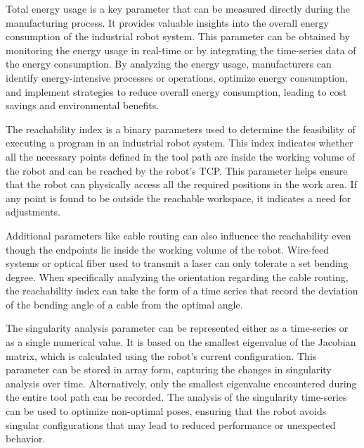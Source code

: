 Total energy usage is a key parameter that can be measured directly during the manufacturing process. It provides valuable insights into the overall energy consumption of the industrial robot system. This parameter can be obtained by monitoring the energy usage in real-time or by integrating the time-series data of the energy consumption. By analyzing the energy usage, manufacturers can identify energy-intensive processes or operations, optimize energy consumption, and implement strategies to reduce overall energy consumption, leading to cost savings and environmental benefits.



The reachability index is a binary parameters used to determine the feasibility of executing a program in an industrial robot system. This index indicates whether all the necessary points defined in the tool path are inside the working volume of the robot and can be reached by the robot's TCP. This parameter helps ensure that the robot can physically access all the required positions in the work area. If any point is found to be outside the reachable workspace, it indicates a need for adjustments. 

Additional parameters like cable routing can also influence the reachability even though the endpoints lie inside the working volume of the robot. Wire-feed systems or optical fiber used to transmit a laser can only tolerate a set bending degree. When specifically analyzing the orientation regarding the cable routing, the reachability index can take the form of a time series that record the deviation of the bending angle of a cable from the optimal angle.


The singularity analysis parameter can be represented either as a time-series or as a single numerical value. It is based on the smallest eigenvalue of the Jacobian matrix, which is calculated using the robot's current configuration. This parameter can be stored in array form, capturing the changes in singularity analysis over time. Alternatively, only the smallest eigenvalue encountered during the entire tool path can be recorded. The analysis of the singularity time-series can be used to optimize non-optimal poses, ensuring that the robot avoids singular configurations that may lead to reduced performance or unexpected behavior.

